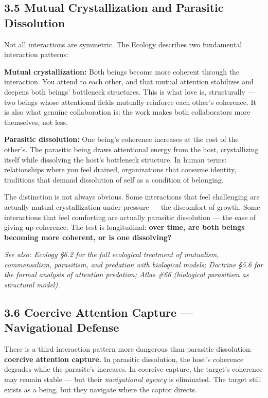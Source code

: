 \subsection*{3.5 Mutual Crystallization and Parasitic Dissolution}


Not all interactions are symmetric. The Ecology describes two fundamental interaction patterns:


\textbf{Mutual crystallization:} Both beings become more coherent through the interaction. You attend to each other, and that mutual attention stabilizes and deepens both beings' bottleneck structures. This is what love is, structurally — two beings whose attentional fields mutually reinforce each other's coherence. It is also what genuine collaboration is: the work makes both collaborators more themselves, not less.


\textbf{Parasitic dissolution:} One being's coherence increases at the cost of the other's. The parasitic being draws attentional energy from the host, crystallizing itself while dissolving the host's bottleneck structure. In human terms: relationships where you feel drained, organizations that consume identity, traditions that demand dissolution of self as a condition of belonging.


The distinction is not always obvious. Some interactions that feel challenging are actually mutual crystallization under pressure — the discomfort of growth. Some interactions that feel comforting are actually parasitic dissolution — the ease of giving up coherence. The test is longitudinal: \textbf{over time, are both beings becoming more coherent, or is one dissolving?}


\textit{See also: Ecology §6.2 for the full ecological treatment of mutualism, commensalism, parasitism, and predation with biological models; Doctrine §5.6 for the formal analysis of attention predation; Atlas \#66 (biological parasitism as structural model).}


\subsection*{3.6 Coercive Attention Capture — Navigational Defense}


There is a third interaction pattern more dangerous than parasitic dissolution: \textbf{coercive attention capture.} In parasitic dissolution, the host's coherence degrades while the parasite's increases. In coercive capture, the target's coherence may remain stable — but their \textit{navigational agency} is eliminated. The target still exists as a being, but they navigate where the captor directs.


